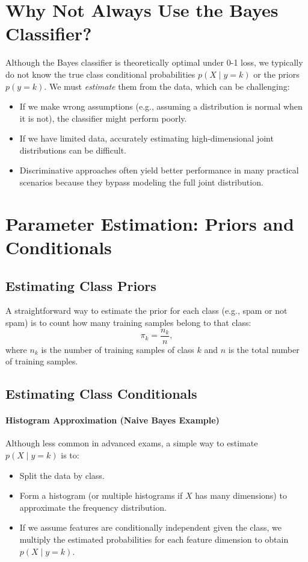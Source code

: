 \documentclass[10pt]{article}
\begin{document}
\section{Why Not Always Use the Bayes Classifier?}

Although the Bayes classifier is theoretically optimal under 0-1 loss, we typically do not know the true class conditional probabilities \(p(X \mid y=k)\) or the priors \(p(y=k)\). We must \emph{estimate} them from the data, which can be challenging:
\begin{itemize}
  \item If we make wrong assumptions (e.g., assuming a distribution is normal when it is not), the classifier might perform poorly.
  \item If we have limited data, accurately estimating high-dimensional joint distributions can be difficult.
  \item Discriminative approaches often yield better performance in many practical scenarios because they bypass modeling the full joint distribution.
\end{itemize}

\section{Parameter Estimation: Priors and Conditionals}

\subsection{Estimating Class Priors}

A straightforward way to estimate the prior for each class (e.g., spam or not spam) is to count how many training samples belong to that class:
\[
\pi_k = \frac{n_k}{n},
\]
where \(n_k\) is the number of training samples of class \(k\) and \(n\) is the total number of training samples.

\subsection{Estimating Class Conditionals}

\paragraph{Histogram Approximation (Naive Bayes Example)} 
Although less common in advanced exams, a simple way to estimate \(p(X \mid y = k)\) is to:
\begin{itemize}
  \item Split the data by class.
  \item Form a histogram (or multiple histograms if \(X\) has many dimensions) to approximate the frequency distribution.
  \item If we assume features are conditionally independent given the class, we multiply the estimated probabilities for each feature dimension to obtain \(p(X \mid y = k)\).
\end{itemize}
\end{document}
